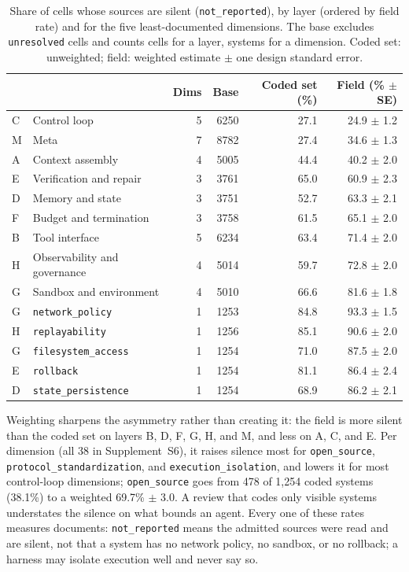 \begin{table}[tbp]
\caption{Share of cells whose sources are silent (\texttt{not\_reported}), by layer (ordered by field
rate) and for the five least-documented dimensions. The base excludes \texttt{unresolved} cells and
counts cells for a layer, systems for a dimension. Coded set: unweighted; field: weighted estimate $\pm$
one design standard error.}
\label{tab:landscape_layers}
\footnotesize
\begin{tabular}{llrrrr}
\toprule
 & & Dims & Base & Coded set (\%) & Field (\% $\pm$ SE) \\
\midrule
C & Control loop                 & 5 & 6250 & 27.1 & 24.9 $\pm$ 1.2 \\
M & Meta                         & 7 & 8782 & 27.4 & 34.6 $\pm$ 1.3 \\
A & Context assembly             & 4 & 5005 & 44.4 & 40.2 $\pm$ 2.0 \\
E & Verification and repair      & 3 & 3761 & 65.0 & 60.9 $\pm$ 2.3 \\
D & Memory and state             & 3 & 3751 & 52.7 & 63.3 $\pm$ 2.1 \\
F & Budget and termination       & 3 & 3758 & 61.5 & 65.1 $\pm$ 2.0 \\
B & Tool interface               & 5 & 6234 & 63.4 & 71.4 $\pm$ 2.0 \\
H & Observability and governance & 4 & 5014 & 59.7 & 72.8 $\pm$ 2.0 \\
G & Sandbox and environment      & 4 & 5010 & 66.6 & 81.6 $\pm$ 1.8 \\
\midrule
G & \texttt{network\_policy}     & 1 & 1253 & 84.8 & 93.3 $\pm$ 1.5 \\
H & \texttt{replayability}       & 1 & 1256 & 85.1 & 90.6 $\pm$ 2.0 \\
G & \texttt{filesystem\_access}  & 1 & 1254 & 71.0 & 87.5 $\pm$ 2.0 \\
E & \texttt{rollback}            & 1 & 1254 & 81.1 & 86.4 $\pm$ 2.4 \\
D & \texttt{state\_persistence}  & 1 & 1254 & 68.9 & 86.2 $\pm$ 2.1 \\
\bottomrule
\end{tabular}
\end{table}

Weighting sharpens the asymmetry rather than creating it: the field is more silent than the coded set
on layers B, D, F, G, H, and M, and less on A, C, and E. Per dimension (all 38 in Supplement~S6), it
raises silence most for \texttt{open\_source}, \texttt{protocol\_standardization}, and
\texttt{execution\_isolation}, and lowers it for most control-loop dimensions; \texttt{open\_source}
goes from 478 of 1,254 coded systems (38.1\%) to a weighted 69.7\% $\pm$ 3.0. A review that codes only
visible systems understates the silence on what bounds an agent. Every one of these rates measures documents:
\texttt{not\_reported} means the admitted sources were read and are silent, not that a system has no network policy,
no sandbox, or no rollback; a harness may isolate execution well and never say so.

